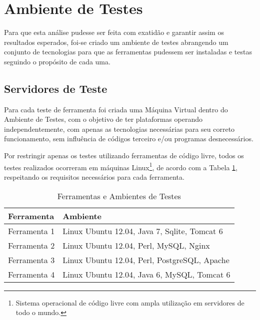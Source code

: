\section{Ambiente de Testes}

Para que esta análise pudesse ser feita com exatidão e garantir assim os resultados esperados, foi-se criado um ambiente de testes abrangendo um conjunto de tecnologias para que as ferramentas pudessem ser instaladas e testas seguindo o propósito de cada uma.

\subsection{Servidores de Teste}

Para cada teste de ferramenta foi criada uma Máquina Virtual dentro do Ambiente de Testes, com o objetivo de ter plataformas operando independentemente, com apenas as tecnologias necessárias para seu correto funcionamento, sem influência de códigos terceiro e/ou programas desnecessários.

Por restringir apenas os testes utilizando ferramentas de código livre, todos os testes realizados ocorreram em máquinas Linux\footnote{Sistema operacional de código livre com ampla utilização em servidores de todo o mundo.}, de acordo com a Tabela \ref{tab:lista-servidores}, respeitando os requisitos necessários para cada ferramenta.

\begin{table}
    \caption{Ferramentas e Ambientes de Testes}
    \begin{center}
        \begin{tabular}{|p{3cm}|p{8cm}|}
            \hline \textbf{Ferramenta} & \textbf{Ambiente}\\ 
            \hline Ferramenta 1 & Linux Ubuntu 12.04, Java 7, Sqlite, Tomcat 6 \\
            \hline Ferramenta 2 & Linux Ubuntu 12.04, Perl, MySQL, Nginx \\
            \hline Ferramenta 3 & Linux Ubuntu 12.04, Perl, PostgreSQL, Apache \\
            \hline Ferramenta 4 & Linux Ubuntu 12.04, Java 6, MySQL, Tomcat 6 \\
            \hline 
        \end{tabular} 
    \end{center}
    \label{tab:lista-servidores}
\end{table}